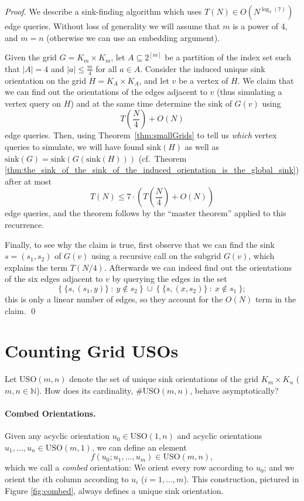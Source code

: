 \documentclass[runningheads,a4paper]{llncs}
\newcommand{\USO}{\ensuremath{\mathrm{USO}}}
\newcommand{\sink}{\ensuremath{\mathrm{sink}}}
\begin{document}
\begin{proof}
    We describe a sink-finding algorithm which uses
    $T(N) \in O(N ^ {\log_4(7)})$ edge queries.
    Without loss of generality we will assume that $m$ is a power of $4$, and
    $m=n$ (otherwise we can use an embedding argument).

    Given the grid $G = K_m \times K_m$, let $A \subseteq 2 ^ {[m]}$
    be a partition of the index set such that
    $|A| = 4$ and $|a| \le \frac{m}{4}$ for all $a \in A$.
    Consider the induced unique sink orientation on the grid
    $H = K_A \times K_A$, and let $v$ be a vertex of $H$.
    We claim that we can find out the orientations of the edges adjacent to
    $v$ (thus simulating a vertex query on $H$)
    and at the same time determine the sink of $G(v)$ using
    \[
        T \left( \frac{N}{4} \right) + O(N)
    \]
    edge queries.
    Then, using Theorem~\ref{thm:smallGrids} to tell us \emph{which} vertex
    queries to simulate, we will have found $\sink(H)$ as well as
    $\sink(G) = \sink(G(\sink(H)))$ (cf.~Theorem
    \ref{thm:the_sink_of_the_sink_of_the_induced_orientation_is_the_global_sink})
    after at most
    \[
        T(N) \le 7 \cdot \left( T \left( \frac{N}{4} \right) + O(N) \right)
    \]
    edge queries, and the theorem follows by the ``master theorem'' applied to
    this recurrence.

    Finally, to see why the claim is true, first observe that we can find the
    sink $s = (s_1,s_2)$ of $G(v)$ using a recursive call on the subgrid
    $G(v)$, which explains the term $T(N/4)$.
    Afterwards we can indeed find out the orientations of the six edges
    adjacent to $v$ by querying the edges in the set
    \[
        \bigl\{~ \{ s,(s_1,y) \} ~:~ y \notin s_2 ~\bigr\}
        ~\cup~
        \bigl\{~ \{ s,(x,s_2) \} ~:~ x \notin s_1 ~\bigr\};
    \]
    this is only a linear number of edges, so they account for the $O(N)$
    term in the claim. \qed
\end{proof}

\section{Counting Grid USOs}
\label{section:counting_unique_sink_orientations}


Let $\USO(m,n)$ denote the set of unique sink orientations of the grid
$K_m \times K_n$ ($m,n \in \mathbb{N}$).
How does its cardinality, $\#\USO(m,n)$, behave asymptotically?

\paragraph{Combed Orientations.}
Given any acyclic orientation $u_0 \in \USO(1,n)$ and acyclic orientations
$u_1,\dots,u_n \in \USO(m,1)$, we can define an element
\[ f(u_0;u_1,\dots,u_m) \in \USO(m,n), \]
which we call a \emph{combed} orientation:
We orient every row according to $u_0$; and we orient the $i$th column
according to $u_i$ ($i = 1,\dots,m$).
This construction, pictured in Figure \ref{fig:combed}, always defines a
unique sink orientation.
\end{document}
